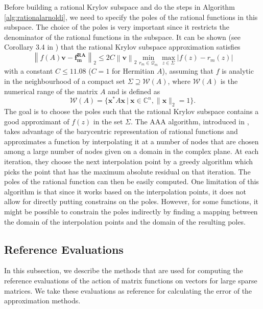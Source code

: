 Before building a rational Krylov subspace and do the steps in Algorithm \ref{alg:rationalarnoldi},
we need to specify the poles of the rational functions in this subspace.
The choice of the poles is very important since it restricts the denominator of the rational
functions in the subspace. It can be shown (see Corollary 3.4 in \cite{guttel2013rational}) that
the rational Krylov subspace approximation satisfies
\begin{equation*}
    \left\| f(A)\mathbf{v} - \mathbf{f_m^{RA}}  \right\|_2 \le 2 C \left\| \mathbf{v} \right\|_2
    \min_{r_m \in \mathcal{Q}_{m}} \max_{z \in \Sigma} | f(z) - r_m(z) |
\end{equation*}
with a constant $C \le 11.08$ ($C = 1$ for Hermitian $A$), assuming that $f$ is analytic in
the neighbourhood of a compact set $\Sigma \supseteq \mathcal{W}(A)$, where $\mathcal{W}(A)$
is the numerical range of the matrix $A$ and is defined as
\begin{equation}
    \label{eq:numericalrange}
    \mathcal{W}(A) = \{\mathbf{x^*} A \mathbf{x} \:|\: \mathbf{x} \in \mathbb{C}^{n}, \|\mathbf{x}\|_2=1\}.
\end{equation}
The goal is to choose the poles such that the rational Krylov subspace contains a good approximant
of $f(z)$ in the set $\Sigma$.
The AAA algorithm, introduced in \cite{nakatsukasa2018AAA}, takes advantage of the barycentric
representation of rational functions and approximates a function by interpolating it at a number
of nodes that are chosen among a large number of nodes given on a domain in the complex plane.
At each iteration, they choose the next interpolation point by a greedy algorithm which picks
the point that has the maximum absolute residual on that iteration. The poles of the rational
function can then be easily computed.
One limitation of this algorithm is that since it works based on the interpolation points,
it does not allow for directly putting constrains on the poles. However, for some functions,
it might be possible to constrain the poles indirectly by finding a mapping between the
domain of the interpolation points and the domain of the resulting poles.

\subsection{Reference Evaluations}
\label{sec:exactevaluation}

In this subsection, we describe the methods that are used for computing the reference
evaluations of the action of matrix functions on vectors for large sparse matrices.
We take these evaluations as reference for calculating the error of the approximation methods.

